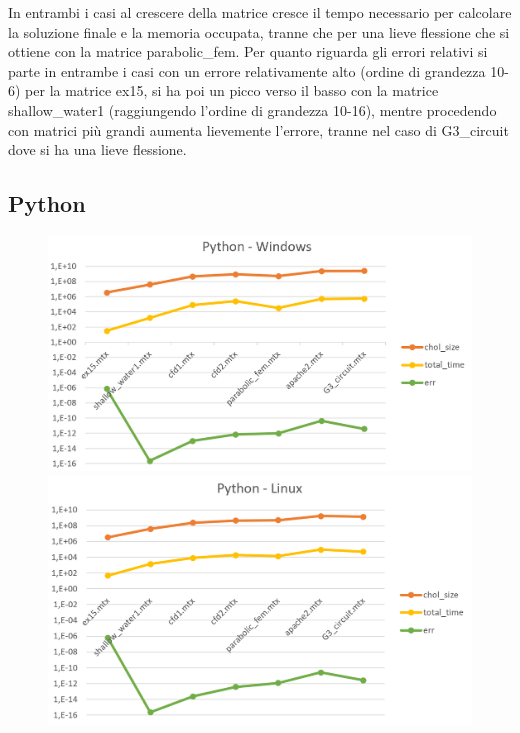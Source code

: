 \documentclass[a4paper,10pt]{article}
\begin{document}
In entrambi i casi al crescere della matrice cresce il tempo necessario per calcolare la soluzione finale e la memoria occupata, tranne che per una lieve flessione che si ottiene con la matrice parabolic\_fem. 
Per quanto riguarda gli errori relativi si parte in entrambe i casi con un errore relativamente alto (ordine di grandezza 10-6) per la matrice ex15, si ha poi un picco verso il basso con la matrice shallow\_water1 (raggiungendo l’ordine di grandezza 10-16), mentre procedendo con matrici più grandi aumenta lievemente l’errore, tranne nel caso di G3\_circuit dove si ha una lieve flessione. 


\subsection{Python}

\begin{figure}[H]
\centering
\begin{minipage}{.6\textwidth}
  \centering
  \includegraphics[width=1\linewidth]{img/pythonwin.png}
\end{minipage}%
\begin{minipage}{.6\textwidth}
  \centering
  \includegraphics[width=1\linewidth]{img/pythonlinux.png}
\end{minipage}
\end{figure}
\end{document}
